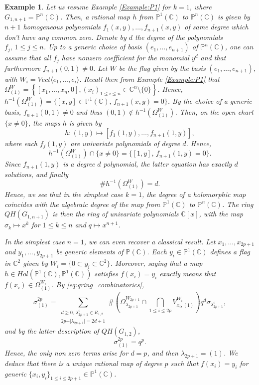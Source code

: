 \documentclass[10pt,11pt]{amsart}%
\newtheorem{example}[theorem]{Example}
\begin{document}
\begin{example}\label{Example:QuantumCohomP1}
Let us resume Example \ref{Example:P1} for $k=1$, where $G_{1,n+1}=\mathbb{P}^n(\mathbb{C})$. Then, a rational map $h$ from $\mathbb{P}^1(\mathbb{C})$ to $\mathbb{P}^n(\mathbb{C})$ is given by $n+1$ homogeneous polynomials $f_1(x,y),\ldots,f_{n+1}(x,y)$ of same degree which don't have any common zero. Denote by $d$ the degree of the polynomials $f_j,\, 1\leq j\leq n$. Up to a generic choice of basis $(e_1,\ldots,e_{n+1})$ of $\mathbb{P}^n(\mathbb{C})$, one can assume that all $f_j$ have nonzero coefficient for the monomial $y^d$ and that furthermore $f_{n+1}(0,1)\not=0$.  Let $W$ be the flag given by the basis $(e_1,\ldots,e_{n+1})$, with $W_{i}=Vect\langle e_1,\ldots,e_{i}\rangle$.  Recall then from Example \ref{Example:P1} that $\Omega_{(1)}^W=\left\lbrace [x_1,\ldots,x_{n},0], (x_i)_{1\leq i\leq n}\in \mathbb{C}^n\setminus\{0\}\right\}$. Hence, $h^{-1}(\Omega_{(1)}^W)=\{[x,y]\in\mathbb{P}^1(\mathbb{C}), \,f_{n+1}(x,y)=0\}$. By the choice of a generic basis, $f_{n+1}(0,1)\not=0$ and thus $(0,1)\not\in h^{-1}(\Omega_{(1)}^W)$. Then, on the open chart $\{x\not=0\}$, the  maps $h$ is given by 
$$h: (1,y)\mapsto [f_1(1,y),\ldots,f_{n+1}(1,y)],$$
where each $f_j(1,y)$ are univariate polynomials of degree $d$. Hence, 
$$h^{-1}(\Omega_{(1)}^W)\cap \{x\not= 0\}=\{[1,y], \, f_{n+1}(1,y)=0\}.$$ 
Since $f_{n+1}(1,y)$ is a degree $d$ polynomial, the latter equation has exactly $d$ solutions, and finally 
$$\#h^{-1}\left(\Omega_{(1)}^W\right)=d.$$
Hence, we see that in the simplest case $k=1$, the degree of a holomorphic map coincides with the algebraic degree of the map from $\mathbb{P}^1(\mathbb{C})$ to $\mathbb{P}^n(\mathbb{C})$. The ring $QH(G_{1,n+1})$ is then the ring of univariate polynomials $\mathbb{C}[x]$, with the map $\sigma_{k}\mapsto x^k$ for $1\leq k\leq n$ and $q\mapsto x^{n+1}$.

In the simplest case $n=1$, we can even recover a classical result. Let $x_1,\ldots,x_{2p+1}$ and $y_1, \ldots, y_{2p+1}$ be generic elements of $\mathbb{P}(\mathbb{C})$. Each $y_i\in\mathbb{P}^1(\mathbb{C})$ defines a flag in $\mathbb{C}^2$ given by $W_i=\{0\subset y_i\subset \mathbb{C}^2\}$. Moreover, saying that a map $h\in Hol(\mathbb{P}^1(\mathbb{C}),\mathbb{P}^1(\mathbb{C}))$ satisfies $f(x_i)=y_i$ exactly means that $f(x_i)\in \Omega_{(1)}^{W_i}$. By \eqref{eq:qring_combinatorics},
$$\sigma_{(1)}^{2p}=\sum_{\substack{d\geq 0, \,\lambda_{2p+1}^c\in R_{1,2}\\ 2p+\vert \lambda_{2p+1}\vert=2d+1}}\#\left(\Omega_{\lambda_{2p+1}}^{W_{2p+1}}\cap \bigcap_{1\leq i\leq 2p} V_{x_i,(1)}^{W_i}\right)q^d\sigma_{\lambda_{2p+1}^c},$$
and by the latter description of $QH(G_{1,2})$,
$$\sigma_{(1)}^{2p}=q^p.$$
Hence, the only non zero terms arise for $d=p$, and then $\lambda_{2p+1}=(1)$. We deduce that there is a unique rational map of degree $p$ such that $f(x_i)=y_i$ for generic $\{x_i,y_i\}_{1\leq i\leq 2p+1}\in\mathbb{P}^1(\mathbb{C})$.
\end{example}
\end{document}
